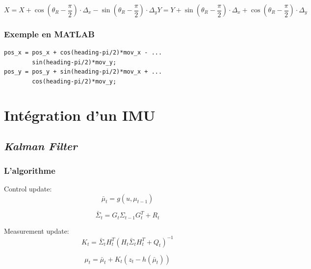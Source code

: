 \documentclass[a4paper]{paper}
\begin{document}
\begin{subequations}
    \begin{equation}
        X = X + \cos \left( \theta_R - \frac{\pi}{2} \right) \cdot \Delta_x - \sin \left( \theta_R - \frac{\pi}{2} \right) \cdot \Delta_y
    \end{equation}
    \begin{equation} 
        Y = Y + \sin \left( \theta_R - \frac{\pi}{2} \right) \cdot \Delta_x + \cos \left( \theta_R - \frac{\pi}{2} \right) \cdot \Delta_y
    \end{equation} 
    \label{eqn:coordinate-transform}
\end{subequations}

\subsubsection{Exemple en MATLAB}
\begin{lstlisting}
pos_x = pos_x + cos(heading-pi/2)*mov_x - ...
        sin(heading-pi/2)*mov_y;
pos_y = pos_y + sin(heading-pi/2)*mov_x + ...
        cos(heading-pi/2)*mov_y;
\end{lstlisting}


\section{Intégration d'un IMU}

\subsection{\emph{Kalman Filter}}

\subsubsection{L'algorithme}

Control update:
\begin{equation}
    \bar{\mu}_t = g \left(u, \mu_{t-1} \right) 
\end{equation}

\begin{equation}
    \bar{\Sigma}_t = G_t \Sigma_{t-1} G_t^T + R_t
\end{equation}

Measurement update:
\begin{equation}
    K_t = \bar{\Sigma}_t H_t^T \left( H_t \bar{\Sigma}_t H_t^T + Q_t \right) ^{-1}
\end{equation}

\begin{equation}
    \mu_t = \bar{\mu}_t + K_t \left( z_t - h \left( \bar{\mu}_t \right) \right)
\end{equation}
\end{document}
